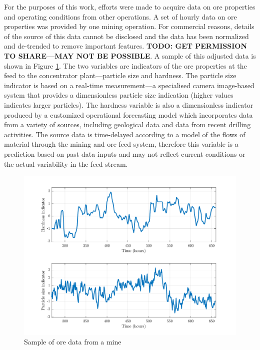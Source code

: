 For the purposes of this work, efforts were made to acquire data on ore properties and operating conditions from other operations. A set of hourly data on ore properties was provided by one mining operation. For commercial reasons, details of the source of this data cannot be disclosed and the data has been normalized and de-trended to remove important features. \textbf{TODO: GET PERMISSION TO SHARE—MAY NOT BE POSSIBLE}. A sample of this adjusted data is shown in Figure \ref{fig:dist_sample}. The two variables are indicators of the ore properties at the feed to the concentrator plant---particle size and hardness. The particle size indicator is based on a real-time measurement---a specialised camera image-based system that provides a dimensionless particle size indication (higher values indicates larger particles). The hardness variable is also a dimensionless indicator produced by a customized operational forecasting model which incorporates data from a variety of sources, including geological data and data from recent drilling activities. The source data is time-delayed according to a model of the flows of material through the mining and ore feed system, therefore this variable is a prediction based on past data inputs and may not reflect current conditions or the actual variability in the feed stream.

\begin{figure}[htp]
	\centering
	\includegraphics[width=15cm]{images/ind-data-snapshot-tsplot.pdf}
	\caption{Sample of ore data from a mine}
	\label{fig:dist_sample}
\end{figure}

